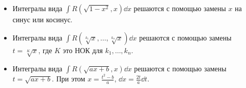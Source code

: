 \begin{itemize}
\item Интегралы вида \(\int R(\sqrt{1 - x^2}, x) \dd x\) решаются с помощью
замены \(x\) на синус или косинус.

\item Интегралы вида \(\int R(\sqrt[k_{1}]{x}, \dots, \sqrt[k_{n}]{x}) \dd x\)
решаются с помощью замены \(t = \sqrt[K]{x}\), где \(K\) это НОК для
\(k_{1}, \dotsc, k_{n}\).

\item Интегралы вида \(\int R(\sqrt{ax + b}, x) \dd x\) решаются с помощью
замены \(t = \sqrt{ax + b}\). При этом \(x = \frac{t^2 - b}{a}\),
\(\dd x = \frac{2t}{a} \dd t\).
\end{itemize}
